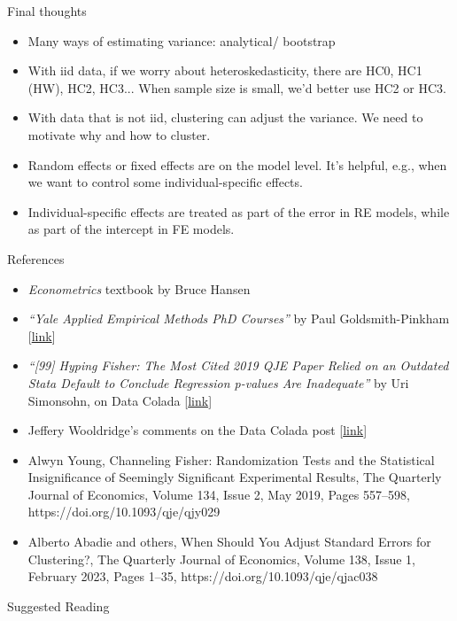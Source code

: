 \begin{frame}{Final thoughts}
\begin{itemize}
    \item Many ways of estimating variance: analytical/ bootstrap
    \item With iid data, if we worry about heteroskedasticity, there are HC0, HC1 (HW), HC2, HC3... When sample size is small, we'd better use HC2 or HC3.
    \item With data that is not iid, clustering can adjust the variance. We need to motivate why and how to cluster.
    \item Random effects or fixed effects are on the model level. It's helpful, e.g., when we want to control some individual-specific effects.
    \item Individual-specific effects are treated as part of the error in RE models, while as part of the intercept in FE models.

\end{itemize}

\end{frame}


\begin{frame}{References}
\begin{itemize}
\item \textit{Econometrics} textbook by Bruce Hansen
\item \textit{``Yale Applied Empirical Methods PhD Courses''} by Paul Goldsmith-Pinkham [\hyperlink{https://github.com/paulgp/applied-methods-phd/blob/main/lectures/05_regression_1.pdf}{link}]
\item \textit{``[99] Hyping Fisher: The Most Cited 2019 QJE Paper Relied on an Outdated Stata Default to Conclude Regression p-values Are Inadequate''} by Uri Simonsohn, on Data Colada [\hyperlink{http://datacolada.org/99}{link}]
\item Jeffery Wooldridge's comments on the Data Colada post [\hyperlink{https://twitter.com/jmwooldridge/status/1449778751911305219?lang=en}{link}]
\item Alwyn Young, Channeling Fisher: Randomization Tests and the Statistical Insignificance of Seemingly Significant Experimental Results, The Quarterly Journal of Economics, Volume 134, Issue 2, May 2019, Pages 557–598, https://doi.org/10.1093/qje/qjy029
\item Alberto Abadie and others, When Should You Adjust Standard Errors for Clustering?, The Quarterly Journal of Economics, Volume 138, Issue 1, February 2023, Pages 1–35, https://doi.org/10.1093/qje/qjac038

\end{itemize}
\end{frame}



\nocite{}

\begin{frame}[allowframebreaks]{Suggested Reading}
    
\end{frame}

